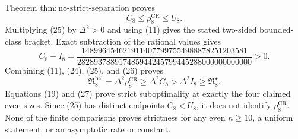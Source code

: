 Theorem \(\mathrm{thm{:}n8\mbox{-}strict\mbox{-}separation}\) proves
\[
 C_8\leq\rho_8^{\mathrm{CR}}\leq U_8. \tag{25}
\]
Multiplying (25) by \(\Delta^2>0\) and using (11) gives the stated two-sided bounded-class bracket.  Exact subtraction of the rational values gives
\[
 C_8-I_8
 =\frac{1489964546219114077997554988878251203581}
 {282893788917485944245799445288000000000000}>0. \tag{26}
\]
Combining (11), (24), (25), and (26) proves
\[
 \mathfrak R_8^{\mathrm{bal}}
 =\Delta^2\rho_8^{\mathrm{CR}}
 \geq\Delta^2 C_8
 >\Delta^2I_8
 \geq\mathfrak R_8^\star. \tag{27}
\]
Equations (19) and (27) prove strict suboptimality at exactly the four claimed even sizes.  Since (25) has distinct endpoints \(C_8<U_8\), it does not identify \(\rho_8^{\mathrm{CR}}\).  None of the finite comparisons proves strictness for any even \(n\geq10\), a uniform statement, or an asymptotic rate or constant.
